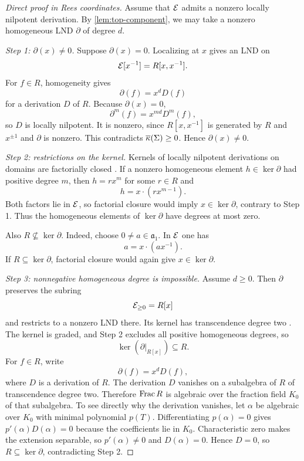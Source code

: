 \begin{proof}[Direct proof in Rees coordinates]
Assume that $\mathcal E$ admits a nonzero locally nilpotent derivation.  By \cref{lem:top-component}, we may take a nonzero homogeneous LND $\partial$ of degree $d$.

\smallskip
\noindent\emph{Step 1: $\partial(x)\neq0$.}
Suppose $\partial(x)=0$.  Localizing at $x$ gives an LND on
\[
  \mathcal E[x^{-1}]=R[x,x^{-1}].
\]
For $f\in R$, homogeneity gives
\[
  \partial(f)=x^dD(f)
\]
for a derivation $D$ of $R$.  Because $\partial(x)=0$,
\[
  \partial^m(f)=x^{md}D^m(f),
\]
so $D$ is locally nilpotent.  It is nonzero, since $R[x,x^{-1}]$ is generated by $R$ and $x^{\pm1}$ and $\partial$ is nonzero.  This contradicts $\overline\kappa(\Sigma)\geq0$.  Hence $\partial(x)\neq0$.

\smallskip
\noindent\emph{Step 2: restrictions on the kernel.}
Kernels of locally nilpotent derivations on domains are factorially closed \cite[Section 1.1]{Freudenburg2017}.  If a nonzero homogeneous element $h\in\ker\partial$ had positive degree $m$, then $h=rx^m$ for some $r\in R$ and
\[
  h=x\cdot(rx^{m-1}).
\]
Both factors lie in $\mathcal E$, so factorial closure would imply $x\in\ker\partial$, contrary to Step 1.  Thus the homogeneous elements of $\ker\partial$ have degrees at most zero.

Also $R\not\subseteq\ker\partial$.  Indeed, choose $0\neq a\in\mathfrak a_1$.  In $\mathcal E$ one has
\[
  a=x\cdot(ax^{-1}).
\]
If $R\subseteq\ker\partial$, factorial closure would again give $x\in\ker\partial$.

\smallskip
\noindent\emph{Step 3: nonnegative homogeneous degree is impossible.}
Assume $d\geq0$.  Then $\partial$ preserves the subring
\[
  \mathcal E_{\geq0}=R[x]
\]
and restricts to a nonzero LND there.  Its kernel has transcendence degree two \cite[Section 1.1]{Freudenburg2017}.  The kernel is graded, and Step 2 excludes all positive homogeneous degrees, so
\[
  \ker(\partial|_{R[x]})\subseteq R.
\]
For $f\in R$, write
\[
  \partial(f)=x^dD(f),
\]
where $D$ is a derivation of $R$.  The derivation $D$ vanishes on a subalgebra of $R$ of transcendence degree two.  Therefore $\operatorname{Frac} R$ is algebraic over the fraction field $K_0$ of that subalgebra.  To see directly why the derivation vanishes, let $\alpha$ be algebraic over $K_0$ with minimal polynomial $p(T)$.  Differentiating $p(\alpha)=0$ gives $p'(\alpha)D(\alpha)=0$ because the coefficients lie in $K_0$.  Characteristic zero makes the extension separable, so $p'(\alpha)\neq0$ and $D(\alpha)=0$.  Hence $D=0$, so $R\subseteq\ker\partial$, contradicting Step 2.


\end{proof}
